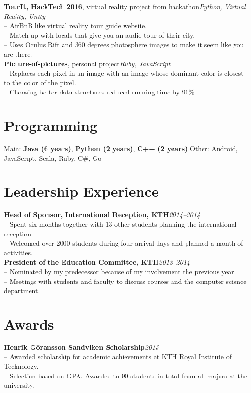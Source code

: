 \documentclass[10pt]{article}
\begin{document}
\noindent\textbf{TourIt, HackTech 2016}, virtual reality project from hackathon\hfill \textit{Python, Virtual Reality, Unity} \\
\indent-- AirBnB like virtual reality tour guide website.\\
\indent-- Match up with locals that give you an audio tour of their city.\\
\indent-- Uses Oculus Rift and 360 degrees photosphere images to make it seem like you are there.\\

\noindent\textbf{Picture-of-pictures}, personal project\hfill \textit{Ruby, JavaScript} \\
\indent-- Replaces each pixel in an image with an image whose dominant color is closest to the color of the pixel.\\
\indent-- Choosing better data structures reduced running time by 90\%. \\

\section*{Programming}
\hline
\vspace{0.10em}
\indent Main: \textbf{Java (6 years)}, \textbf{Python (2 years)}, \textbf{C++ (2 years)}\hspace{2em} Other: Android, JavaScript, Scala, Ruby, C\#, Go\\

\section*{Leadership Experience}
\hline
\vspace{0.10em}
\noindent\textbf{Head of Sponsor, International Reception, KTH}\hfill\textit{2014--2014} \\
\indent-- Spent six months together with 13 other students planning the international reception.\\
\indent-- Welcomed over 2000 students during four arrival days and planned a month of activities. \\

\noindent\textbf{President of the Education Committee, KTH}\hfill\textit{2013--2014} \\
\indent-- Nominated by my predecessor because of my involvement the previous year.\\
\indent-- Meetings with students and faculty to discuss courses and the computer science department.\\

\section*{Awards}
\hline
\vspace{0.10em}
\textbf{Henrik Göransson Sandviken Scholarship}\hfill\textit{2015}\\
\indent-- Awarded scholarship for academic achievements at KTH Royal Institute of Technology.\\
\indent-- Selection based on GPA. Awarded to 90 students in total from all majors at the university.\\
\end{document}
